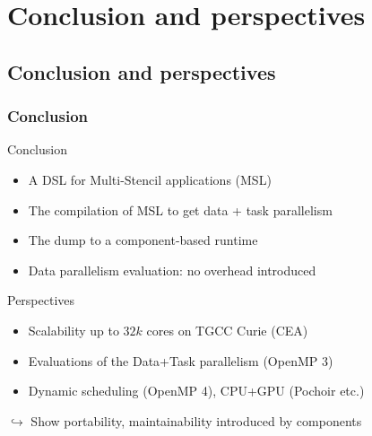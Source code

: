 \documentclass{beamer}
\makeatletter
\newenvironment{withoutheadline}{
        \setbeamertemplate{headline}[default]
        \def\beamer@entrycode{\vspace*{-\headheight}}
    }{}
\makeatother
\begin{document}
\section{Conclusion and perspectives}
\subsection{Conclusion and perspectives}
\begin{frame}
\frametitle{Conclusion}
\begin{block}{Conclusion}
\begin{itemize}
\item A DSL for Multi-Stencil applications (MSL)
\item The compilation of MSL to get data + task parallelism
\item The dump to a component-based runtime
\item Data parallelism evaluation: no overhead introduced 
\end{itemize}
\end{block}

\begin{block}{Perspectives}
\begin{itemize}
\item Scalability up to $32k$ cores on TGCC Curie (CEA)
\item Evaluations of the Data+Task parallelism (OpenMP 3)
\item Dynamic scheduling (OpenMP 4), CPU+GPU (Pochoir etc.)
\end{itemize}
$\hookrightarrow$ Show portability, maintainability introduced by components
\end{block}
\end{frame}

\end{document}
